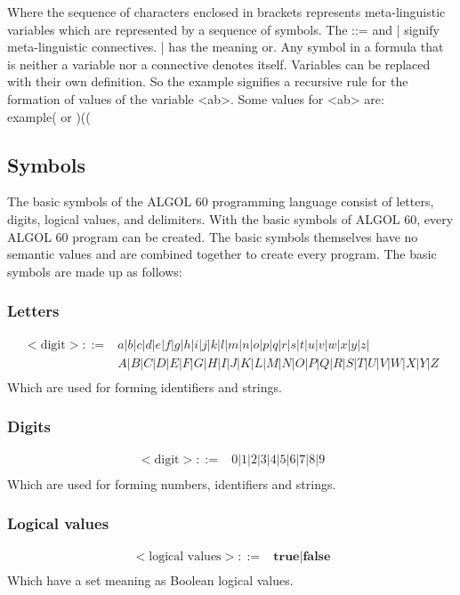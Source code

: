 \documentclass{article}
\begin{document}
Where the sequence of characters enclosed in brackets represents meta-linguistic variables which are represented by a sequence of symbols. The ::= and | signify meta-linguistic connectives. | has the meaning or. Any symbol in a formula that is neither a variable nor a connective denotes itself. Variables can be replaced with their own definition. So the example signifies a recursive rule for the formation of values of the variable <ab>. Some values for <ab> are:\\

example( or )((

\subsection{Symbols}
The basic symbols of the ALGOL 60 programming language consist of letters, digits, logical values, and delimiters. With the basic symbols of ALGOL 60, every ALGOL 60 program can be created. The basic symbols themselves have no semantic values and are combined together to create every program. The basic symbols are made up as follows: \\

\subsubsection{Letters}
\begin{equation} \label{eq2}
\begin{split}
<\text{digit}> ::=&a|b|c|d|e|f|g|h|i|j|k|l|m|n|o|p|q|r|s|t|u|v|w|x|y|z|\\&A|B|C|D|E|F|G|H|I|J|K|L|M|N|O|P|Q|R|S|T|U|V|W|X|Y|Z \\
\end{split}
\end{equation}
Which are used for forming identifiers and strings.

\subsubsection{Digits}
\begin{equation} \label{eq3}
\begin{split}
<\text{digit}> ::=&0|1|2|3|4|5|6|7|8|9 \\
\end{split}
\end{equation}
Which are used for forming numbers, identifiers and strings.

\subsubsection{Logical values}
\begin{equation} \label{eq4}
\begin{split}
<\text{logical values}> ::=&\textbf{true}|\textbf{false} \\
\end{split}
\end{equation}
Which have a set meaning as Boolean logical values.
\end{document}

